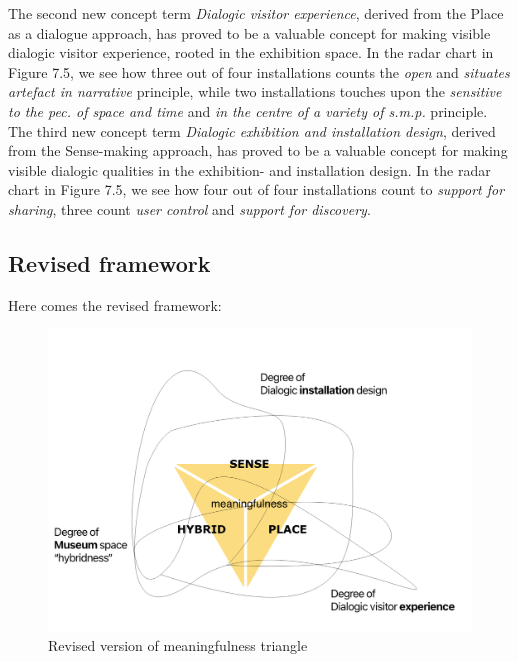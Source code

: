 The second new concept term \textit{Dialogic visitor experience}, derived from the Place as a dialogue approach, has proved to be a valuable concept for making visible dialogic visitor experience, rooted in the exhibition space. In the radar chart in Figure 7.5, we see how three out of four installations counts the \emph{open} and \emph{situates artefact in narrative} principle, while two installations touches upon the \emph{sensitive to the pec. of space and time} and \emph{in the centre of a variety of s.m.p.} principle. The third new concept term \textit{Dialogic exhibition and installation design}, derived from the Sense-making approach, has proved to be a valuable concept for making visible dialogic qualities in the exhibition- and installation design. In the radar chart in Figure 7.5, we see how four out of four installations count to \emph{support for sharing}, three count \emph{user control} and \textit{support for discovery}.

\subsection{Revised framework}
Here comes the revised framework:

\begin{figure}[H]
    \centering 
    \includegraphics[width=13cm]{pictures/analysis/triangle_revised.png}
    \caption{Revised version of meaningfulness triangle}
\end{figure}

